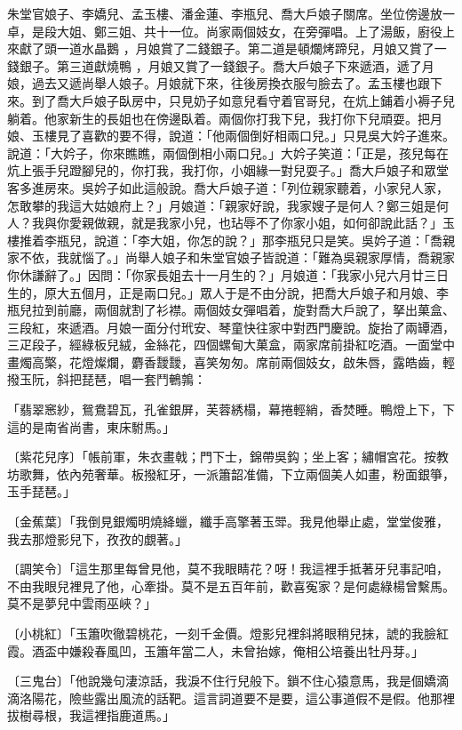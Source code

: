 朱堂官娘子、李嬌兒、孟玉樓、潘金蓮、李瓶兒、喬大戶娘子關席。坐位傍邊放一卓，是段大姐、鄭三姐、共十一位。尚家兩個妓女，在旁彈唱。上了湯飯，廚役上來獻了頭一道水晶鵝 ，月娘賞了二錢銀子。第二道是頓爛烤蹄兒，月娘又賞了一錢銀子。第三道獻燒鴨 ，月娘又賞了一錢銀子。喬大戶娘子下來遞酒，遞了月娘，過去又遞尚舉人娘子。月娘就下來，往後房換衣服勻臉去了。孟玉樓也跟下來。到了喬大戶娘子臥房中，只見奶子如意兒看守着官哥兒，在炕上鋪着小褥子兒躺着。他家新生的長姐也在傍邊臥着。兩個你打我下兒，我打你下兒頑耍。把月娘、玉樓見了喜歡的要不得，說道：「他兩個倒好相兩口兒。」只見吳大妗子進來。說道：「大妗子，你來瞧瞧，兩個倒相小兩口兒。」大妗子笑道：「正是，孩兒每在炕上張手兒蹬腳兒的，你打我，我打你，小姻緣一對兒耍子。」喬大戶娘子和眾堂客多進房來。吳妗子如此這般說。喬大戶娘子道：「列位親家聽着，小家兒人家，怎敢攀的我這大姑娘府上？」月娘道：「親家好說，我家嫂子是何人？鄭三姐是何人？我與你愛親做親，就是我家小兒，也玷辱不了你家小姐，如何卻說此話？」玉樓推着李瓶兒，說道：「李大姐，你怎的說？」那李瓶兒只是笑。吳妗子道：「喬親家不依，我就惱了。」尚舉人娘子和朱堂官娘子皆說道：「難為吳親家厚情，喬親家你休謙辭了。」因問：「你家長姐去十一月生的？」月娘道：「我家小兒六月廿三日生的，原大五個月，正是兩口兒。」眾人于是不由分說，把喬大戶娘子和月娘、李瓶兒拉到前廳，兩個就割了衫襟。兩個妓女彈唱着，旋對喬大戶說了，拏出菓盒、三段紅，來遞酒。月娘一面分付玳安、琴童快往家中對西門慶說。旋抬了兩罈酒，三疋段子，經綠板兒絨，金絲花，四個螺甸大菓盒，兩家席前掛紅吃酒。一面堂中畫燭高檠，花燈燦爛，麝香靉靉，喜笑匆匆。席前兩個妓女，啟朱唇，露皓齒，輕撥玉阮，斜把琵琶，唱一套鬥鵪鶉：

「翡翠窸紗，鴛鴦碧瓦，孔雀銀屏，芙蓉綉榻，幕捲輕綃，香焚睡。鴨燈上下，下這的是南省尚書，東床駙馬。」

〔紫花兒序〕「帳前軍，朱衣畫戟；門下士，錦帶吳鈎；坐上客；繡帽宮花。按教坊歌舞，依內苑奢華。板撥紅牙，一派簫韶准備，下立兩個美人如畫，粉面銀箏，玉手琵琶。」

〔金蕉葉〕「我倒見銀燭明燒絳蠟，纖手高擎著玉斝。我見他舉止處，堂堂俊雅，我去那燈影兒下，孜孜的覷著。」

〔調笑令〕「這生那里每曾見他，莫不我眼睛花？呀！我這裡手抵著牙兒事記咱，不由我眼兒裡見了他，心牽掛。莫不是五百年前，歡喜寃家？是何處綠楊曾繫馬。莫不是夢兒中雲雨巫峽？」

〔小桃紅〕「玉簫吹徹碧桃花，一刻千金價。燈影兒裡斜將眼稍兒抹，諕的我臉紅霞。酒盃中嫌殺春風凹，玉簫年當二人，未曾抬嫁，俺相公培養出牡丹芽。」

〔三鬼台〕「他說幾句淒涼話，我淚不住行兒般下。鎖不住心猿意馬，我是個嬌滴滴洛陽花，險些露出風流的話靶。這言詞道要不是要，這公事道假不是假。他那裡拔樹尋根，我這裡指鹿道馬。」

